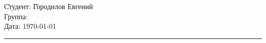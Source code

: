 \begin{tabbing}
\hspace{11cm} \= Студент: \= Городилов Евгений \\
  \> Группа:  \\
  \> Дата: \> \today
\end{tabbing}
\hrule
\vspace{1cm}